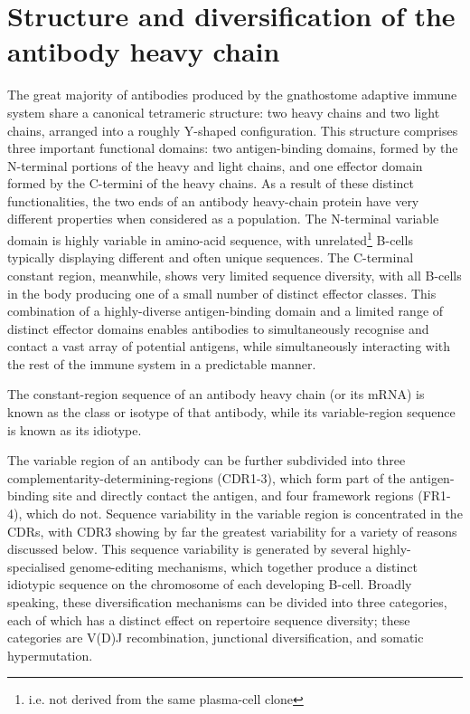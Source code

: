 \newpage 
\section{Structure and diversification of the antibody heavy chain}


The great majority of antibodies produced by the gnathostome adaptive immune system share a canonical tetrameric structure: two heavy chains and two light chains, arranged into a roughly Y-shaped configuration. This structure comprises three important functional domains: two antigen-binding domains, formed by the N-terminal portions of the heavy and light chains, and one effector domain formed by the C-termini of the heavy chains. As a result of these distinct functionalities, the two ends of an antibody heavy-chain protein have very different properties when considered as a population. The N-terminal variable domain is highly variable in amino-acid sequence, with unrelated\footnote{i.e. not derived from the same plasma-cell clone} B-cells typically displaying different and often unique sequences. The C-terminal constant region, meanwhile, shows very limited sequence diversity, with all B-cells in the body producing one of a small number of distinct effector classes. This combination of a highly-diverse antigen-binding domain and a limited range of distinct effector domains enables antibodies to simultaneously recognise and contact a vast array of potential antigens, while simultaneously interacting with the rest of the immune system in a predictable manner.

The constant-region sequence of an antibody heavy chain (or its mRNA) is known as the class or isotype of that antibody, while its variable-region sequence is known as its idiotype. %

The variable region of an antibody can be further subdivided into three complementarity-determining-regions (CDR1-3), which form part of the antigen-binding site and directly contact the antigen, and four framework regions (FR1-4), which do not. Sequence variability in the variable region is concentrated in the CDRs, with CDR3 showing by far the greatest variability for a variety of reasons discussed below. %
This sequence variability is generated by several highly-specialised genome-editing mechanisms, which together produce a distinct idiotypic sequence on the chromosome of each developing B-cell. Broadly speaking, these diversification mechanisms can be divided into three categories, each of which has a distinct effect on repertoire sequence diversity; these categories are V(D)J recombination, junctional diversification, and somatic hypermutation.

